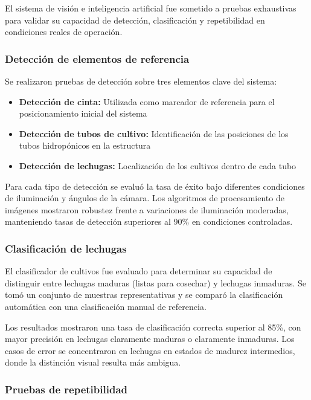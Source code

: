 El sistema de visión e inteligencia artificial fue sometido a pruebas exhaustivas para validar su capacidad de detección, clasificación y repetibilidad en condiciones reales de operación.

\subsubsection{Detección de elementos de referencia}

Se realizaron pruebas de detección sobre tres elementos clave del sistema:

\begin{itemize}
    \item \textbf{Detección de cinta:} Utilizada como marcador de referencia para el posicionamiento inicial del sistema
    \item \textbf{Detección de tubos de cultivo:} Identificación de las posiciones de los tubos hidropónicos en la estructura
    \item \textbf{Detección de lechugas:} Localización de los cultivos dentro de cada tubo
\end{itemize}

Para cada tipo de detección se evaluó la tasa de éxito bajo diferentes condiciones de iluminación y ángulos de la cámara. Los algoritmos de procesamiento de imágenes mostraron robustez frente a variaciones de iluminación moderadas, manteniendo tasas de detección superiores al 90\% en condiciones controladas.

\subsubsection{Clasificación de lechugas}

El clasificador de cultivos fue evaluado para determinar su capacidad de distinguir entre lechugas maduras (listas para cosechar) y lechugas inmaduras. Se tomó un conjunto de muestras representativas y se comparó la clasificación automática con una clasificación manual de referencia.

Los resultados mostraron una tasa de clasificación correcta superior al 85\%, con mayor precisión en lechugas claramente maduras o claramente inmaduras. Los casos de error se concentraron en lechugas en estados de madurez intermedios, donde la distinción visual resulta más ambigua.

\subsubsection{Pruebas de repetibilidad}

